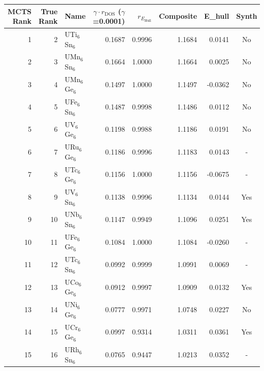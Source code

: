\begin{tabular}{rrlrrrrc}
\toprule
MCTS Rank & True Rank & Name & $\gamma \cdot r_{\mathrm{DOS}}$ ($\gamma$=0.0001) & $r_{E_{\mathrm{Hull}}}$ & Composite & E\_hull & Synth \\
\midrule
1 & 2 & UTi$_{6}$Sn$_{6}$ & 0.1687 & 0.9996 & 1.1684 & 0.0141 & No \\
2 & 3 & UMn$_{6}$Sn$_{6}$ & 0.1664 & 1.0000 & 1.1664 & 0.0025 & No \\
3 & 4 & UMn$_{6}$Ge$_{6}$ & 0.1497 & 1.0000 & 1.1497 & -0.0362 & No \\
4 & 5 & UFe$_{6}$Sn$_{6}$ & 0.1487 & 0.9998 & 1.1486 & 0.0112 & No \\
5 & 6 & UV$_{6}$Ge$_{6}$ & 0.1198 & 0.9988 & 1.1186 & 0.0191 & No \\
6 & 7 & URu$_{6}$Ge$_{6}$ & 0.1186 & 0.9996 & 1.1183 & 0.0143 & - \\
7 & 8 & UTc$_{6}$Ge$_{6}$ & 0.1156 & 1.0000 & 1.1156 & -0.0675 & - \\
8 & 9 & UV$_{6}$Sn$_{6}$ & 0.1138 & 0.9996 & 1.1134 & 0.0144 & Yes \\
9 & 10 & UNb$_{6}$Sn$_{6}$ & 0.1147 & 0.9949 & 1.1096 & 0.0251 & Yes \\
10 & 11 & UFe$_{6}$Ge$_{6}$ & 0.1084 & 1.0000 & 1.1084 & -0.0260 & - \\
11 & 12 & UTc$_{6}$Sn$_{6}$ & 0.0992 & 0.9999 & 1.0991 & 0.0069 & - \\
12 & 13 & UCo$_{6}$Ge$_{6}$ & 0.0912 & 0.9997 & 1.0909 & 0.0132 & Yes \\
13 & 14 & UNi$_{6}$Ge$_{6}$ & 0.0777 & 0.9971 & 1.0748 & 0.0227 & No \\
14 & 15 & UCr$_{6}$Ge$_{6}$ & 0.0997 & 0.9314 & 1.0311 & 0.0361 & Yes \\
15 & 16 & URh$_{6}$Sn$_{6}$ & 0.0765 & 0.9447 & 1.0213 & 0.0352 & - \\
\bottomrule
\end{tabular}
